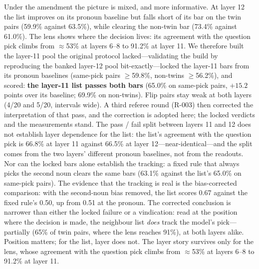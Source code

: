 \documentclass[11pt]{article}
\begin{document}
Under the amendment the picture is mixed, and more informative. At layer 12 the list improves on its pronoun baseline but falls short of its bar on the twin pairs (59.9\% against 63.5\%), while clearing the non-twin bar (73.4\% against 61.0\%). The lens shows where the decision lives: its agreement with the question pick climbs from $\approx$53\% at layers 6--8 to 91.2\% at layer 11. We therefore built the layer-11 pool the original protocol lacked---validating the build by reproducing the banked layer-12 pool bit-exactly---locked the layer-11 bars from its pronoun baselines (same-pick pairs $\ge$59.8\%, non-twins $\ge$56.2\%), and scored: \textbf{the layer-11 list passes both bars} (65.0\% on same-pick pairs, $+15.2$ points over its baseline; 69.9\% on non-twins). Flip pairs stay weak at both layers (4/20 and 5/20, intervals wide). A third referee round (R-003) then corrected the interpretation of that pass, and the correction is adopted here; the locked verdicts and the measurements stand. The pass / fail split between layers 11 and 12 does not establish layer dependence for the list: the list's agreement with the question pick is 66.8\% at layer 11 against 66.5\% at layer 12---near-identical---and the split comes from the two layers' different pronoun baselines, not from the readouts. Nor can the locked bars alone establish the tracking: a fixed rule that always picks the second noun clears the same bars (63.1\% against the list's 65.0\% on same-pick pairs). The evidence that the tracking is real is the bias-corrected comparison: with the second-noun bias removed, the list scores 0.67 against the fixed rule's 0.50, up from 0.51 at the pronoun. The corrected conclusion is narrower than either the locked failure or a vindication: read at the position where the decision is made, the neighbour list \emph{does} track the model's pick---partially (65\% of twin pairs, where the lens reaches 91\%), at both layers alike. Position matters; for the list, layer does not. The layer story survives only for the lens, whose agreement with the question pick climbs from $\approx$53\% at layers 6--8 to 91.2\% at layer 11.
\end{document}
